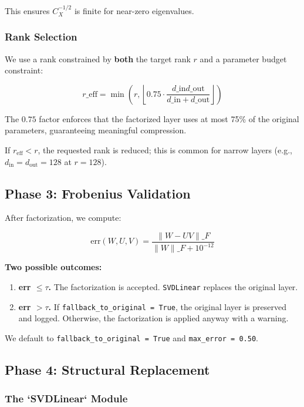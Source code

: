 This ensures $C_X^{-1/2}$ is finite for near-zero eigenvalues.

\subsubsection{Rank Selection}

We use a rank constrained by \textbf{both} the target rank $r$ and a parameter 
budget constraint:

\[
r\_\text{eff} = \min\!\left(r, \left\lfloor 0.75 \cdot \frac{d\_\text{in} d\_\text{out}}{d\_\text{in} + d\_\text{out}} \right\rfloor \right)
\tag{4.14}
\]

The $0.75$ factor enforces that the factorized layer uses at most 75\% of the 
original parameters, guaranteeing meaningful compression.

If $r_\text{eff} < r$, the requested rank is reduced; this is common for 
narrow layers (e.g., $d_\text{in} = d_\text{out} = 128$ at $r = 128$).

\subsection{Phase 3: Frobenius Validation}

After factorization, we compute:

\[
\text{err}(W, U, V) = \frac{\|W - UV\|\_F}{\|W\|\_F + 10^{-12}}
\tag{4.15}
\]

\textbf{Two possible outcomes:}

\begin{enumerate}
\item \textbf{err $\leq \tau$.} The factorization is accepted. \texttt{SVDLinear} replaces
  the original layer.
\item \textbf{err $> \tau$.} If \texttt{fallback\_to\_original = True}, the original layer
  is preserved and logged. Otherwise, the factorization is applied anyway
  with a warning.

\end{enumerate}
We default to \texttt{fallback\_to\_original = True} and \texttt{max\_error = 0.50}.

\subsection{Phase 4: Structural Replacement}

\subsubsection{The `SVDLinear` Module}

